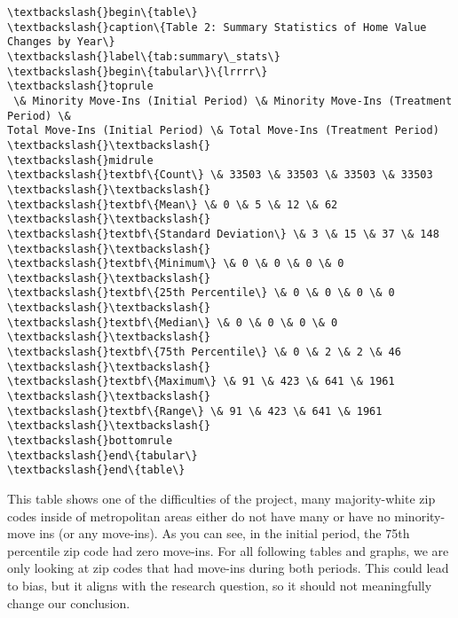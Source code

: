 \documentclass[11pt]{article}
\begin{document}
    \begin{Verbatim}[commandchars=\\\{\}]
\textbackslash{}begin\{table\}
\textbackslash{}caption\{Table 2: Summary Statistics of Home Value Changes by Year\}
\textbackslash{}label\{tab:summary\_stats\}
\textbackslash{}begin\{tabular\}\{lrrrr\}
\textbackslash{}toprule
 \& Minority Move-Ins (Initial Period) \& Minority Move-Ins (Treatment Period) \&
Total Move-Ins (Initial Period) \& Total Move-Ins (Treatment Period) \textbackslash{}\textbackslash{}
\textbackslash{}midrule
\textbackslash{}textbf\{Count\} \& 33503 \& 33503 \& 33503 \& 33503 \textbackslash{}\textbackslash{}
\textbackslash{}textbf\{Mean\} \& 0 \& 5 \& 12 \& 62 \textbackslash{}\textbackslash{}
\textbackslash{}textbf\{Standard Deviation\} \& 3 \& 15 \& 37 \& 148 \textbackslash{}\textbackslash{}
\textbackslash{}textbf\{Minimum\} \& 0 \& 0 \& 0 \& 0 \textbackslash{}\textbackslash{}
\textbackslash{}textbf\{25th Percentile\} \& 0 \& 0 \& 0 \& 0 \textbackslash{}\textbackslash{}
\textbackslash{}textbf\{Median\} \& 0 \& 0 \& 0 \& 0 \textbackslash{}\textbackslash{}
\textbackslash{}textbf\{75th Percentile\} \& 0 \& 2 \& 2 \& 46 \textbackslash{}\textbackslash{}
\textbackslash{}textbf\{Maximum\} \& 91 \& 423 \& 641 \& 1961 \textbackslash{}\textbackslash{}
\textbackslash{}textbf\{Range\} \& 91 \& 423 \& 641 \& 1961 \textbackslash{}\textbackslash{}
\textbackslash{}bottomrule
\textbackslash{}end\{tabular\}
\textbackslash{}end\{table\}

    \end{Verbatim}

    This table shows one of the difficulties of the project, many
majority-white zip codes inside of metropolitan areas either do not have
many or have no minority-move ins (or any move-ins). As you can see, in
the initial period, the 75th percentile zip code had zero move-ins. For
all following tables and graphs, we are only looking at zip codes that
had move-ins during both periods. This could lead to bias, but it aligns
with the research question, so it should not meaningfully change our
conclusion.
\end{document}
